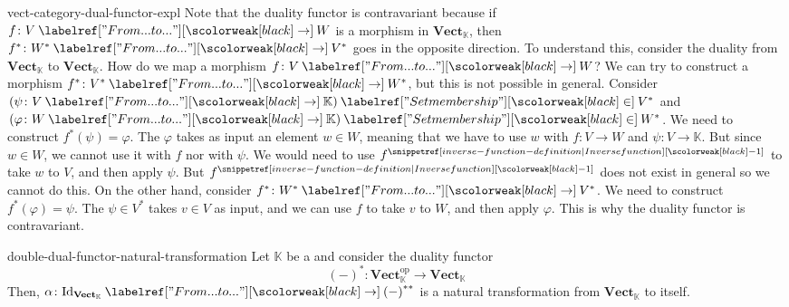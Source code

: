 \documentclass[preview]{standalone}
\begin{document}
\begin{snippet}{vect-category-dual-functor-expl}
    Note that the duality functor is contravariant because
    if \(f \colon V \fromto W\) is a morphism in \(\mathbf{Vect}_\mathbb{K}\),
    then \(f^* \colon W^* \fromto V^*\) goes in the opposite direction.
    To understand this, consider the duality \functor from \(\mathbf{Vect}_\mathbb{K}\) to \(\mathbf{Vect}_\mathbb{K}\).
    How do we map a morphism \(f \colon V \fromto W\)?
    We can try to construct a morphism \(f^* \colon V^* \fromto W^*\),
    but this is not possible in general.
    Consider \((\psi \colon V \fromto \mathbb{K}) \in V^*\) and
    \((\varphi \colon W \fromto \mathbb{K}) \in W^*\).
    We need to construct \(f^*(\psi) = \varphi\).
    The \function \(\varphi\) takes as input an element \(w \in W\),
    meaning that we have to use \(w\) with \(f \colon V \to W\) and \(\psi \colon V \to \mathbb{K}\).
    But since \(w\in W\), we cannot use it with \(f\) nor with \(\psi\).
    We would need to use \(f^\inversefunction\) to take \(w\) to \(V\), and then apply \(\psi\).
    But \(f^\inversefunction\) does not exist in general so we cannot do this.
    On the other hand, consider \(f^* \colon W^* \fromto V^*\).
    We need to construct \(f^*(\varphi) = \psi\).
    The \function \(\psi \in V^*\) takes \(v\in V\) as input,
    and we can use \(f\) to take \(v\) to \(W\),
    and then apply \(\varphi\).
    This is why the duality functor is contravariant.
\end{snippet}

\begin{snippetproposition}{double-dual-functor-natural-transformation}{}
    Let \(\mathbb{K}\) be a \field and consider the duality functor
    \[
        {(-)}^* \colon \mathbf{Vect}_\mathbb{K}^\text{op} \to \mathbf{Vect}_\mathbb{K}
    \]
    Then, \(\alpha \colon \text{Id}_{\mathbf{Vect}_\mathbb{K}} \fromto {(-)}^{**}\)
    is a natural transformation from \(\mathbf{Vect}_\mathbb{K}\) to itself.
\end{snippetproposition}
\end{document}
